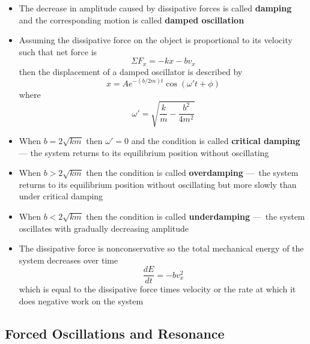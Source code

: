 \documentclass{article}
\begin{document}
\begin{itemize}
    \item The decrease in amplitude caused by dissipative forces is called \textbf{damping} and the corresponding motion is called \textbf{damped oscillation}

    \item Assuming the dissipative force on the object is proportional to its velocity such that net force is \[\Sigma F_x = -kx -bv_x\] then the displacement of a damped oscillator is described by \[x = Ae^{-(b/2m)t}\cos(\omega't + \phi)\] where \[\omega' = \sqrt{\frac{k}{m} - \frac{b^2}{4m^2}}\]

    \item When $b = 2\sqrt{km}$ then $\omega'=0$ and the condition is called \textbf{critical damping} — the system returns to its equilibrium position without oscillating

    \item When $b > 2\sqrt{km}$ then the condition is called \textbf{overdamping} — the system returns to its equilibrium position without oscillating but more slowly than under critical damping

    \item When $b < 2\sqrt{km}$ then the condition is called \textbf{underdamping} — the system oscillates with gradually decreasing amplitude

    \item The dissipative force is nonconservative so the total mechanical energy of the system decreases over time \[\frac{dE}{dt} = -bv_x^2\] which is equal to the dissipative force times velocity or the rate at which it does negative work on the system
\end{itemize}

\subsection{Forced Oscillations and Resonance}
\end{document}
